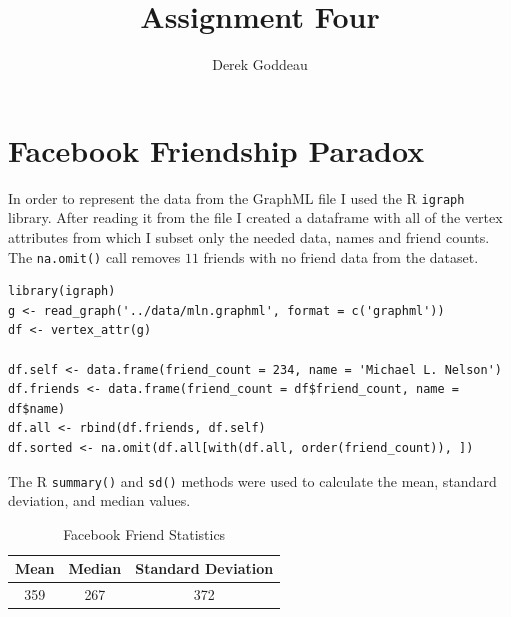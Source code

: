 \documentclass[12pt, a4paper]{article}
\author{Derek Goddeau}
\title{Assignment Four}
\newcommand{\code}[1]{\texttt{#1}}
\begin{document}
\maketitle

\newpage



\section{Facebook Friendship Paradox}

In order to represent the data from the GraphML file I used the R \code{igraph}
library. After reading it from the file I created a dataframe with all of the
vertex attributes from which I subset only the needed data, names and friend counts.
The \code{na.omit()} call removes $11$ friends with no friend data from the dataset.

\begin{minipage}{\linewidth} %
\vspace{2em}
\begin{verbatim}
library(igraph)
g <- read_graph('../data/mln.graphml', format = c('graphml'))
df <- vertex_attr(g)

df.self <- data.frame(friend_count = 234, name = 'Michael L. Nelson')
df.friends <- data.frame(friend_count = df$friend_count, name = df$name)
df.all <- rbind(df.friends, df.self)
df.sorted <- na.omit(df.all[with(df.all, order(friend_count)), ])
\end{verbatim}
\vspace{2em}
\end{minipage}

\noindent
The R \code{summary()} and \code{sd()} methods were used to calculate the
mean, standard deviation, and median values.

\vspace{2em}
\begin{table}[h]
    \centering
    \begin{tabular}{|c|c|c|}
        \hline
        \textbf{Mean} & \textbf{Median} & \textbf{Standard Deviation} \\ \hline
        359           & 267             & 372                         \\ \hline
    \end{tabular}
    \caption{Facebook Friend Statistics}
\end{table}
\vspace{2em}
\end{document}
